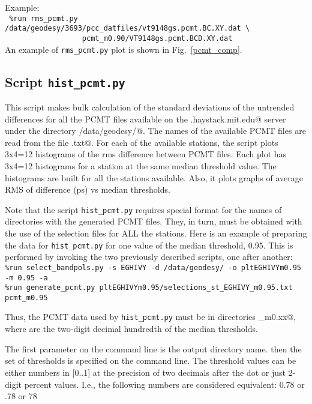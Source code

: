 \documentclass[preprint]{aastex}
\begin{document}
Example: \\
\verb$ %run rms_pcmt.py /data/geodesy/3693/pcc_datfiles/vt9148gs.pcmt.BC.XY.dat \$ \\
\verb$                  pcmt_m0.90/VT9148gs.pcmt.BCD.XY.dat$ \\

An example of \texttt{rms\_pcmt.py} plot is shown in Fig.~\ref{pcmt_comp}.

\begin{figure*}   [ht!]
\caption{\small An example of \texttt{rms\_pcmt.py} output.
\label{pcmt_comp}}
\end{figure*}

\subsection{Script \texttt{hist\_pcmt.py}}

This script makes bulk calculation of the standard deviations of the untrended differences for all the PCMT files available on the \verb@demi.haystack.mit.edu@ server under the directory \verb@/data/geodesy/@. The names of the available PCMT files are read from the file \verb@pcmt.txt@. For each of the available stations, the script plots 
3x4=12 histograms of the rms difference between PCMT files. Each plot has 3x4=12 histograms for a station at the same median threshold value. The histograms are built for all the stations available. Also, it plots graphs of average RMS of difference (ps) vs median thresholds. 

Note that the script \texttt{hist\_pcmt.py} requires special format for the names of directories with the generated PCMT files. They, in turn, must be obtained with the use of the selection files for ALL the stations. Here is an example of preparing the data for \texttt{hist\_pcmt.py} for one value of the median threshold, 0.95. This is performed by invoking the two previously described scripts, one after another: \\
\verb$%run select_bandpols.py -s EGHIVY -d /data/geodesy/ -o pltEGHIVYm0.95 -m 0.95 -a$ \\
\verb$%run generate_pcmt.py pltEGHIVYm0.95/selections_st_EGHIVY_m0.95.txt pcmt_m0.95$

Thus, the PCMT data used by \texttt{hist\_pcmt.py} must be in directories \verb@pcmt_m0.xx@, where \verb@xx@ are the two-digit decimal hundredth of the median thresholds. 

The first parameter on the command line is the output directory name. then the set of thresholds is specified on the command line. The threshold values can be either numbers in [0..1] at the precision of two decimals after the dot or just 2-digit percent values. I.e., the following numbers are considered equivalent: 0.78 or .78 or 78
\end{document}
